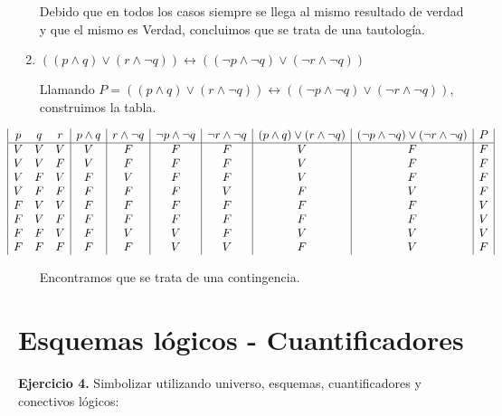 \begin{enumerate}
	Debido que en todos los casos siempre se llega al mismo resultado de verdad y que el mismo es Verdad, concluimos que se trata de una tautolog\'ia.
	
	\item $((p \wedge q) \vee (r \wedge \neg q)) \leftrightarrow ((\neg p \wedge \neg q) \vee (\neg r \wedge \neg q))$
	
	Llamando $P = ((p \wedge q) \vee (r \wedge \neg q)) \leftrightarrow ((\neg p \wedge \neg q) \vee (\neg r \wedge \neg q))$, construimos la tabla.
	
	\begin{displaymath}
		\hspace*{-1cm}
		\begin{array}{|c c c|c|c|c|c|c|c|c|}
			p & q & r & p \wedge q & r \wedge \neg q & \neg p \wedge \neg q & \neg r \wedge \neg q & (p \wedge q) \vee (r \wedge \neg q) & (\neg p \wedge \neg q) \vee (\neg r \wedge \neg q) & P \\
			\hline 
			V & V & V & V & F & F & F & V & F & F\\
			V & V & F & V & F & F & F & V & F & F\\
			V & F & V & F & V & F & F & V & F & F\\
			V & F & F & F & F & F & V & F & V & F\\
			F & V & V & F & F & F & F & F & F & V\\
			F & V & F & F & F & F & F & F & F & V\\
			F & F & V & F & V & V & F & V & V & V\\
			F & F & F & F & F & V & V & F & V & F\\
		\end{array}
	\end{displaymath}

	Encontramos que se trata de una contingencia.
	
\end{enumerate}

\section{Esquemas l\'ogicos - Cuantificadores}

\textbf{Ejercicio 4.} Simbolizar utilizando universo, esquemas, cuantificadores y conectivos lógicos:

